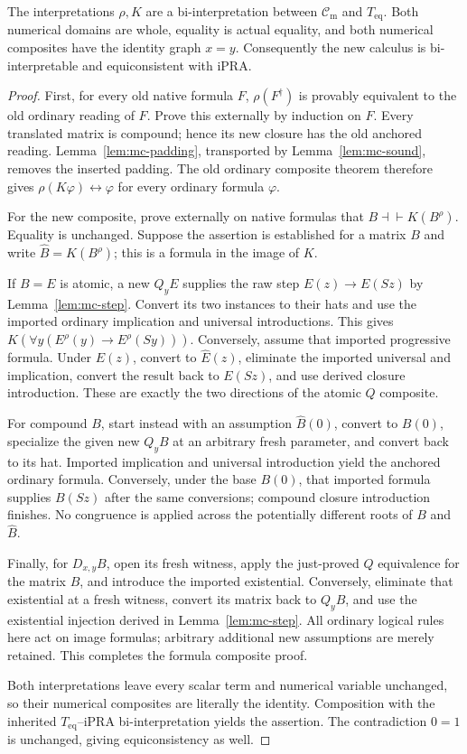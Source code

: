 \begin{theorem}
\label{thm:mc-bi}
The interpretations $\rho,K$ are a bi-interpretation between
$\mathcal C_{\mathrm m}$ and $T_{\mathrm{eq}}$.  Both numerical
domains are whole, equality is actual equality, and both numerical
composites have the identity graph $x=y$.  Consequently the new
calculus is bi-interpretable and equiconsistent with iPRA.
\end{theorem}
\begin{proof}
First, for every old native formula $F$,
$\rho(F^\dagger)$ is provably equivalent to the old ordinary reading
of $F$.  Prove this externally by induction on $F$.
Every translated matrix is compound; hence its new closure has the
old anchored reading.  Lemma~\ref{lem:mc-padding}, transported by
Lemma~\ref{lem:mc-sound}, removes the inserted padding.  The old
ordinary composite theorem therefore gives
$\rho(K\varphi)\leftrightarrow\varphi$ for every ordinary formula
$\varphi$.

For the new composite, prove externally on native formulas that
$B\dashv\vdash K(B^\rho)$.  Equality is unchanged.  Suppose the
assertion is established for a matrix $B$ and write
$\widehat B=K(B^\rho)$; this is a formula in the image of $K$.

If $B=E$ is atomic, a new $Q_yE$ supplies the raw step
$E(z)\to E(Sz)$ by Lemma~\ref{lem:mc-step}.  Convert its two
instances to their hats and use the imported ordinary implication
and universal introductions.  This gives
$K(\forall y(E^\rho(y)\to E^\rho(Sy)))$.
Conversely, assume that imported progressive formula.  Under $E(z)$,
convert to $\widehat E(z)$, eliminate the imported universal and
implication, convert the result back to $E(Sz)$, and use derived
closure introduction.  These are exactly the two directions of the
atomic $Q$ composite.

For compound $B$, start instead with an assumption
$\widehat B(0)$, convert to $B(0)$, specialize the given new $Q_yB$
at an arbitrary fresh parameter, and convert back to its hat.
Imported implication and universal introduction yield the anchored
ordinary formula.  Conversely, under the base $B(0)$, that imported
formula supplies $B(Sz)$ after the same conversions; compound
closure introduction finishes.  No congruence is applied across
the potentially different roots of $B$ and $\widehat B$.

Finally, for $D_{x,y}B$, open its fresh witness, apply the just-proved
$Q$ equivalence for the matrix $B$, and introduce the imported
existential.  Conversely, eliminate that existential at a fresh
witness, convert its matrix back to $Q_yB$, and use the existential
injection derived in Lemma~\ref{lem:mc-step}.  All ordinary logical
rules here act on image formulas; arbitrary additional new assumptions
are merely retained.  This completes the formula composite proof.

Both interpretations leave every scalar term and numerical variable
unchanged, so their numerical composites are literally the identity.
Composition with the inherited $T_{\mathrm{eq}}$--iPRA
bi-interpretation yields the assertion.  The contradiction $0=1$
is unchanged, giving equiconsistency as well.
\end{proof}

